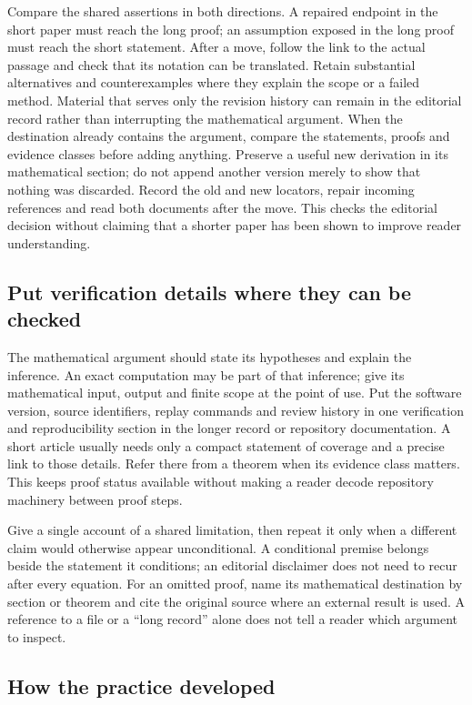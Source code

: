 Compare the shared assertions in both directions. A repaired endpoint in the
short paper must reach the long proof; an assumption exposed in the long proof
must reach the short statement. After a move, follow the link to the actual
passage and check that its notation can be translated. Retain substantial
alternatives and counterexamples where they explain the scope or a failed
method. Material that serves only the revision history can remain in the
editorial record rather than interrupting the mathematical argument.
When the destination already contains the argument, compare the statements,
proofs and evidence classes before adding anything. Preserve a useful new
derivation in its mathematical section; do not append another version merely
to show that nothing was discarded. Record the old and new locators, repair
incoming references and read both documents after the move. This checks the
editorial decision without claiming that a shorter paper has been shown to
improve reader understanding.

\subsection{Put verification details where they can be checked}

The mathematical argument should state its hypotheses and explain the
inference. An exact computation may be part of that inference; give its
mathematical input, output and finite scope at the point of use. Put the
software version, source identifiers, replay commands and review history in
one verification and reproducibility section in the longer record or repository
documentation. A short article usually needs only a compact statement of
coverage and a precise link to those details. Refer there from
a theorem when its evidence class matters. This keeps proof status available
without making a reader decode repository machinery between proof steps.

Give a single account of a shared limitation, then repeat it only when a
different claim would otherwise appear unconditional. A conditional premise
belongs beside the statement it conditions; an editorial disclaimer does
not need to recur after every equation. For an omitted proof, name its
mathematical destination by section or theorem and cite the original source
where an external result is used. A reference to a file or a ``long record''
alone does not tell a reader which argument to inspect.

\subsection{How the practice developed}

